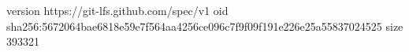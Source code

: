 version https://git-lfs.github.com/spec/v1
oid sha256:5672064bae6818e59e7f564aa4256ce096c7f9f09f191e226e25a55837024525
size 393321
